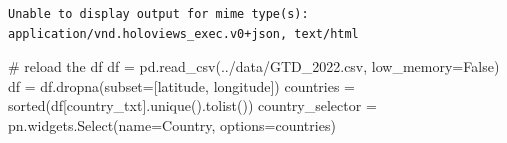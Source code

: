 \documentclass[
  letterpaper,
  DIV=11,
  numbers=noendperiod]{scrreprt}
\newenvironment{Shaded}{\begin{snugshade}}{\end{snugshade}}
\newcommand{\BuiltInTok}[1]{\textcolor[rgb]{0.00,0.23,0.31}{#1}}
\newcommand{\CommentTok}[1]{\textcolor[rgb]{0.37,0.37,0.37}{#1}}
\newcommand{\NormalTok}[1]{\textcolor[rgb]{0.00,0.23,0.31}{#1}}
\newcommand{\OperatorTok}[1]{\textcolor[rgb]{0.37,0.37,0.37}{#1}}
\newcommand{\StringTok}[1]{\textcolor[rgb]{0.13,0.47,0.30}{#1}}
\newcommand{\VariableTok}[1]{\textcolor[rgb]{0.07,0.07,0.07}{#1}}
\begin{document}
\begin{verbatim}
Unable to display output for mime type(s): application/vnd.holoviews_exec.v0+json, text/html
\end{verbatim}

\begin{Shaded}
\begin{Highlighting}[]
\CommentTok{\# reload the df}
\NormalTok{df }\OperatorTok{=}\NormalTok{ pd.read\_csv(}\StringTok{\textquotesingle{}../data/GTD\_2022.csv\textquotesingle{}}\NormalTok{, low\_memory}\OperatorTok{=}\VariableTok{False}\NormalTok{)}
\NormalTok{df }\OperatorTok{=}\NormalTok{ df.dropna(subset}\OperatorTok{=}\NormalTok{[}\StringTok{\textquotesingle{}latitude\textquotesingle{}}\NormalTok{, }\StringTok{\textquotesingle{}longitude\textquotesingle{}}\NormalTok{])}
\NormalTok{countries }\OperatorTok{=} \BuiltInTok{sorted}\NormalTok{(df[}\StringTok{\textquotesingle{}country\_txt\textquotesingle{}}\NormalTok{].unique().tolist())}
\NormalTok{country\_selector }\OperatorTok{=}\NormalTok{ pn.widgets.Select(name}\OperatorTok{=}\StringTok{\textquotesingle{}Country\textquotesingle{}}\NormalTok{, options}\OperatorTok{=}\NormalTok{countries)}
\end{Highlighting}
\end{Shaded}
\end{document}
